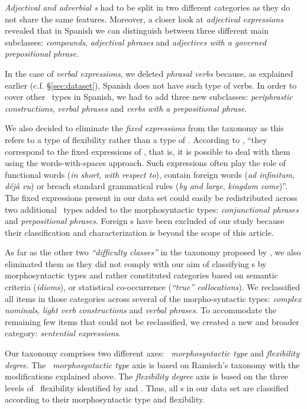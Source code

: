 \documentclass[output=paper]{langsci/langscibook}
\begin{document}
\textit{Adjectival and adverbial \mwe s} had to be split in two different categories as they do not share the same features.
Moreover, a closer look at \textit{adjectival expressions} revealed that in Spanish we can distinguish between three different main subclasses: \textit{compounds}, \textit{adjectival phrases} and \textit{adjectives with a governed prepositional phrase}.

In the case of \textit{verbal expressions}, we deleted \textit{phrasal verbs} because, as explained earlier (c.f. §\ref{sec:dataset}), Spanish does not have such type of verbs.
In order to cover other \mwe\ types in Spanish, we had to add three new subclasses: \textit{periphrastic constructions}, \textit{verbal phrases} and \textit{verbs with a prepositional phrase}.

We also decided to eliminate the \textit{fixed expressions} from the taxonomy as this refers to a type of flexibility rather than a type of \mwe.
According to \citet{Ramisch:2015}, ``they correspond to the fixed expressions of 
\citet{Sag:2002},
that is, it is possible to deal with them using the words-with-spaces approach. Such expressions often play the role of functional words (\textit{in short}, \textit{with respect to}), contain foreign words (\textit{ad infinitum}, \textit{déjà vu}) or breach standard grammatical rules (\textit{by and large}, \textit{kingdom come})''.
The fixed expressions present in our data set could easily be redistributed across two additional \mwe\ types added to the morphosyntactic types: \textit{conjunctional phrases} and \textit{prepositional phrases}.
Foreign \mwe s have been excluded of our study because their classification and characterization is beyond the scope of this article.

As far as the other two \textit{``difficulty classes''} in the taxonomy proposed by \cite{Ramisch:2012,Ramisch:2015}, we also eliminated them as they did not comply with our aim of classifying \mwe s by morphosyntactic types and rather constituted categories based on semantic criteria (\textit{idioms}), or statistical co-occurrence (\textit{``true'' collocations}).
We reclassified all items in those categories across several of the morpho-syntactic types: \textit{complex nominals}, \textit{light verb constructions} and \textit{verbal phrases}.
To accommodate the remaining few items that could not be reclassified, we created a new and broader category: \textit{sentential expressions}.

Our taxonomy comprises two different axes: \textit{\mwe\ morphosyntactic type} and \textit{flexibility degree}.
The \textit{\mwe\ morphosyntactic type} axis is based on Ramisch's \citeyearpar{Ramisch:2012,Ramisch:2015} taxonomy with the modifications explained above.
The \textit{flexibility degree} axis is based on the three levels of \mwe\ flexibility identified by \cite{Sag:2002} and \cite{Baldwin2010}.
Thus, all \mwe s in our data set are classified according to their morphosyntactic type and flexibility.
\end{document}
